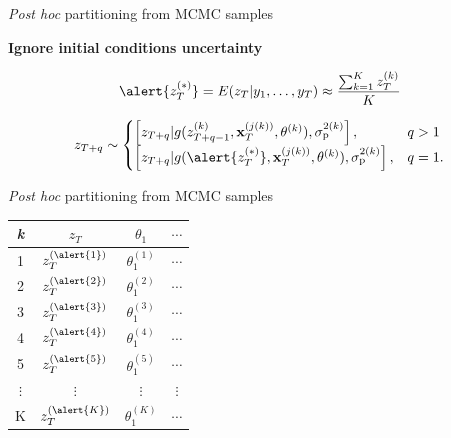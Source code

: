 \documentclass[12pt, compress, aspectratio=1610]{beamer}
\begin{document}
\begin{frame}{%
\protect\hypertarget{partitioning-from-mcmc-samples}{%
\emph{Post hoc} partitioning from MCMC samples}}

\bf{Ignore initial conditions uncertainty}

\begin{equation*}
\alert{z_{T}^{(\ast)}} = E(z_{T} | y_1,\dots,y_T) \approx \frac{\sum^K_{k=1} z_{T}^{(k)}}{K}
\end{equation*}

\begin{equation*}
    z_{T+q} \sim 
\begin{cases}
    \left[z_{T+q} | g(z_{T+q-1}^{(k)}, \textbf{x}_T^{(j(k))}, \boldmath{\theta}^{(k)}), \sigma^{2(k)}_{\text{p}} \right], &q>1 \\
    \left[z_{T+q} | g(\alert{z_{T}^{(\ast)}}, \textbf{x}_T^{(j(k))}, \boldmath{\theta}^{(k)}), \sigma^{2(k)}_{\text{p}} \right], &q=1.
\end{cases}
\end{equation*}

\end{frame}

\begin{frame}{%
\protect\hypertarget{partitioning-from-mcmc-samples-1}{%
\emph{Post hoc} partitioning from MCMC samples}}

\begin{longtable}[]{@{}cccc@{}}
\toprule
\emph{k} & \(z_T\) & \(\theta_1\) & \(\cdots\)\tabularnewline
\midrule
\endhead
1 & \(z_{T}^{(\alert{1})}\) & \(\theta_1^{(1)}\) &
\(\cdots\)\tabularnewline
2 & \(z_{T}^{(\alert{2})}\) & \(\theta_1^{(2)}\) &
\(\cdots\)\tabularnewline
3 & \(z_{T}^{(\alert{3})}\) & \(\theta_1^{(3)}\) &
\(\cdots\)\tabularnewline
4 & \(z_{T}^{(\alert{4})}\) & \(\theta_1^{(4)}\) &
\(\cdots\)\tabularnewline
5 & \(z_{T}^{(\alert{5})}\) & \(\theta_1^{(5)}\) &
\(\cdots\)\tabularnewline
\(\vdots\) & \(\vdots\) & \(\vdots\) & \(\vdots\)\tabularnewline
K & \(z_{T}^{(\alert{K})}\) & \(\theta_1^{(K)}\) &
\(\cdots\)\tabularnewline
\bottomrule
\end{longtable}

\end{frame}
\end{document}
